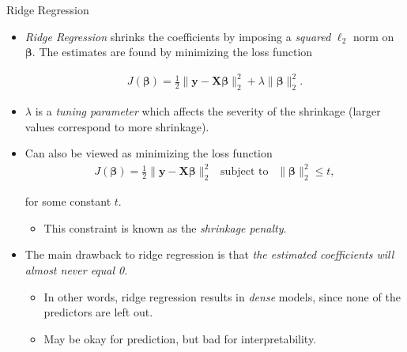 \documentclass[8pt]{beamer}
\newcommand{\mydef}[1]{\textcolor{SteelBlue3}{\textit{#1}}} %
\begin{document}
\begin{frame}{Ridge Regression}

\begin{itemize}
 
    \item \mydef{Ridge Regression} \cite{hoerl1970ridge} shrinks the coefficients by imposing a \textit{squared} $\ell_2$ norm on $\bm{\beta}$. The estimates are found by minimizing the loss function
    
\begin{align*}
    J(\bm{\beta}) = \frac{1}{2} \| \mathbf{y}  - \mathbf{X} \bm{\beta} \|_2^2 + \lambda \| \bm{\beta} \|_2^2.
\end{align*} 

    \item $\lambda$ is a \mydef{tuning parameter} which affects the severity of the shrinkage (larger values correspond to more shrinkage). %

    \item Can also be viewed as minimizing the loss function 
\begin{align*}
    J(\bm{\beta}) = \frac{1}{2} \| \mathbf{y}  - \mathbf{X} \bm{\beta} \|_2^2 ~~\text{ subject to }~~ \| \bm{\beta} \|_2^2 \le t,
\end{align*}

for some constant $t$. 

\begin{itemize}
    \item This constraint is known as the \mydef{shrinkage penalty}.
\end{itemize}

    \item The main drawback to ridge regression is that \textit{the estimated coefficients will almost never equal 0}. 
\begin{itemize}
    \item In other words, ridge regression results in \mydef{dense} models, since none of the predictors are left out. 
    \item May be okay for prediction, but bad for interpretability.
\end{itemize}

\end{itemize}

\end{frame}
\end{document}
